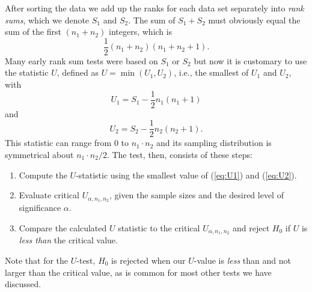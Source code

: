 	After sorting the data we add up the ranks for each data set separately into \emph{rank sums}, which we 
denote $S_1$ and $S_2$.  The sum of $S_1 + S_2$ must obviously equal the sum of the first 
$(n_1 + n_2)$ integers, which is
\begin{equation}
\frac{1}{2} (n_1 + n_2) (n_1 + n_2 + 1 ).
\end{equation}
Many early rank sum tests were based on $S_1$ or $S_2$ but now it is customary to use the statistic $U$,
defined as $U = \min {(U_1,U_2)}$, i.e., the smallest of $U_1$ and $U_2$, with
\begin{equation}
U_1 = S_1 - \frac{1}{2} n_1 (n_1 + 1)
\label{eq:U1}
\end{equation}
and
\begin{equation}
U_2 = S_2 - \frac{1}{2} n_2 (n_2 + 1).
\label{eq:U2}
\end{equation}	 	
This statistic can range from 0 to $n_1\cdot n_2$ and its 
sampling distribution is symmetrical about $n_1 \cdot n_2/2$.  The test, then, consists of these steps:
\begin{enumerate}
	\item Compute the $U$-statistic using the smallest value of (\ref{eq:U1}) and (\ref{eq:U2}).
	\item Evaluate critical $U_{\alpha,n_1,n_2}$, given the sample sizes and the desired level of significance $\alpha$.
	\item Compare the calculated $U$ statistic to the critical $U_{\alpha,n_1,n_2}$ and
		reject $H_0$ if $U$ is \emph{less than} the critical value.
\end{enumerate}
Note that for the $U$-test, $H_0$ is rejected when our $U$-value is \emph{less} than and not larger than
the critical value, as is common for most other tests we have discussed.

